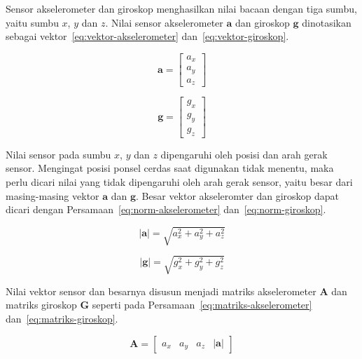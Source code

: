 Sensor akselerometer dan giroskop menghasilkan nilai bacaan dengan tiga sumbu, yaitu sumbu $x$, $y$ dan $z$. Nilai sensor akselerometer $\pmb{a}$ dan giroskop $\pmb{g}$ dinotasikan sebagai vektor~\ref{eq:vektor-akselerometer} dan~\ref{eq:vektor-giroskop}.

\begin{equation}
    \label{eq:vektor-akselerometer}
    \pmb{a} = 
    \begin{bmatrix}
        a_x \\
        a_y \\
        a_z
    \end{bmatrix}
\end{equation}

\begin{equation}
    \label{eq:vektor-giroskop}
    \pmb{g} = 
    \begin{bmatrix}
        g_x \\
        g_y \\
        g_z
    \end{bmatrix}
\end{equation}

Nilai sensor pada sumbu $x$, $y$ dan $z$ dipengaruhi oleh posisi dan arah gerak sensor. Mengingat posisi ponsel cerdas saat digunakan tidak menentu, maka perlu dicari nilai yang tidak dipengaruhi oleh arah gerak sensor, yaitu besar dari masing-masing vektor $\pmb{a}$ dan $\pmb{g}$. Besar vektor akseleromter dan giroskop dapat dicari dengan Persamaan~\ref{eq:norm-akselerometer} dan~\ref{eq:norm-giroskop}.

\begin{equation}
    \label{eq:norm-akselerometer}
    |\pmb{a}| = \sqrt{a_x^2 + a_y^2 + a_z^2}
\end{equation}

\begin{equation}
    \label{eq:norm-giroskop}
    |\pmb{g}| = \sqrt{g_x^2 + g_y^2 + g_z^2}
\end{equation}

Nilai vektor sensor dan besarnya disusun menjadi matriks akselerometer $\pmb{A}$ dan matriks giroskop $\pmb{G}$ seperti pada Persamaan~\ref{eq:matriks-akselerometer} dan~\ref{eq:matriks-giroskop}.

\begin{equation}
    \label{eq:matriks-akselerometer}
    \pmb{A} = 
    \begin{bmatrix}
        a_x & a_y & a_z & |\pmb{a}|
    \end{bmatrix}
\end{equation}

